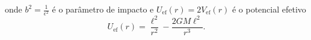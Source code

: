 onde \(b^2 = \frac{1}{\epsilon^2}\) é o parâmetro de impacto e \(U_\mathrm{ef}(r) = 2V_\mathrm{ef}(r)\) é o potencial efetivo
\begin{equation*}
    U_\mathrm{ef}(r) = \frac{\ell^2}{r^2} - \frac{2GM\ell^2}{r^3}.
\end{equation*}
